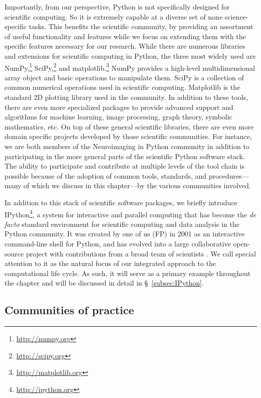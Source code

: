 \documentclass[ChapterTOCs,krantz2]{krantz} %
\begin{document}
Importantly, from our perspective, Python is not specifically designed for
scientific computing.  So it is extremely capable at a diverse set of none
science-specific tasks. This benefits the scientific community, by providing
an assortment of useful functionality and features while we focus on
extending them with the specific features necessary for our research.  While
there are numerous libraries and extensions for scientific computing in Python,
the three most widely used are NumPy,\footnote{\url{http://numpy.org}}
SciPy,\footnote{\url{http://scipy.org}} and
matplotlib.\footnote{\url{http://matplotlib.org}}  NumPy provides a high-level
multidimensional array object and basic operations to manipulate them. SciPy is
a collection of common numerical operations used in scientific computing.
Matplotlib \cite{hunter2007matplotlib, hunter2012matplotlib} is the standard 2D plotting library
used in the community. In addition to these tools, there are even more
specialized packages to provide advanced support and algorithms for machine
learning, image processing, graph theory, symbolic mathematics, etc. On top of
these general scientific libraries, there are even more domain specific
projects developed by those scientific communities. For instance, we are both
members of the Neuroimaging in Python \cite{MIL-BRE:2007} community in addition
to participating in the more general parts of the scientific Python software
stack. The ability to participate and contribute at multiple levels of the tool
chain is possible because of the adoption of common tools, standards, and
procedures---many of which we discuss in this chapter---by the various
communities involved.

In addition to this stack of scientific software packages, we briefly
introduce IPython\footnote{\url{http://ipython.org}}, a system for interactive
and parallel computing that has become the \emph{de facto} standard environment
for scientific computing and data analysis in the Python community.  It was
created by one of us (FP) in 2001 as an interactive command-line shell for
Python, and has evolved into a large collaborative open-source project with
contributions from a broad team of scientists \cite{PER-GRA:2007}. We call
special attention to it as the natural focus of our integrated approach to the
computational life cycle. As such, it will serve as a primary example
throughout the chapter and will be discussed in detail in §~\ref{subsec:IPython}.

\subsection{\label{subsec:community}Communities of practice}
\end{document}
